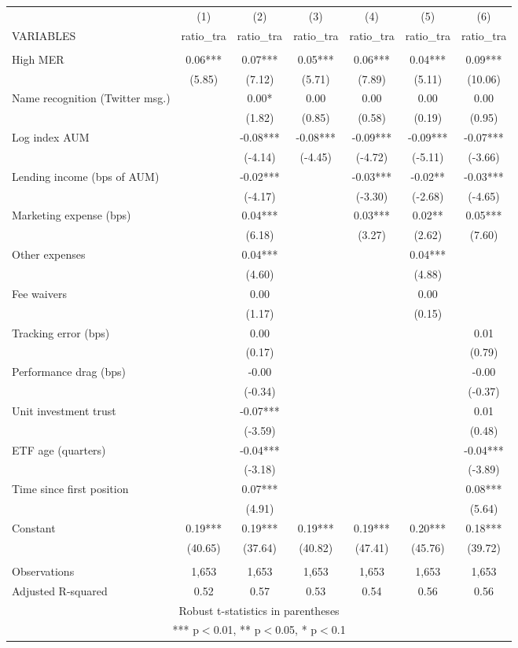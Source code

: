 \documentclass[]{article}
\begin{document}
\begin{tabular}{lcccccc} \hline
 & (1) & (2) & (3) & (4) & (5) & (6) \\
VARIABLES & ratio\_tra & ratio\_tra & ratio\_tra & ratio\_tra & ratio\_tra & ratio\_tra \\ \hline
 &  &  &  &  &  &  \\
High MER & 0.06*** & 0.07*** & 0.05*** & 0.06*** & 0.04*** & 0.09*** \\
 & (5.85) & (7.12) & (5.71) & (7.89) & (5.11) & (10.06) \\
Name recognition (Twitter msg.) &  & 0.00* & 0.00 & 0.00 & 0.00 & 0.00 \\
 &  & (1.82) & (0.85) & (0.58) & (0.19) & (0.95) \\
Log index AUM &  & -0.08*** & -0.08*** & -0.09*** & -0.09*** & -0.07*** \\
 &  & (-4.14) & (-4.45) & (-4.72) & (-5.11) & (-3.66) \\
Lending income (bps of AUM) &  & -0.02*** &  & -0.03*** & -0.02** & -0.03*** \\
 &  & (-4.17) &  & (-3.30) & (-2.68) & (-4.65) \\
Marketing expense (bps) &  & 0.04*** &  & 0.03*** & 0.02** & 0.05*** \\
 &  & (6.18) &  & (3.27) & (2.62) & (7.60) \\
Other expenses &  & 0.04*** &  &  & 0.04*** &  \\
 &  & (4.60) &  &  & (4.88) &  \\
Fee waivers &  & 0.00 &  &  & 0.00 &  \\
 &  & (1.17) &  &  & (0.15) &  \\
Tracking error (bps) &  & 0.00 &  &  &  & 0.01 \\
 &  & (0.17) &  &  &  & (0.79) \\
Performance drag (bps) &  & -0.00 &  &  &  & -0.00 \\
 &  & (-0.34) &  &  &  & (-0.37) \\
Unit investment trust &  & -0.07*** &  &  &  & 0.01 \\
 &  & (-3.59) &  &  &  & (0.48) \\
ETF age (quarters) &  & -0.04*** &  &  &  & -0.04*** \\
 &  & (-3.18) &  &  &  & (-3.89) \\
Time since first position &  & 0.07*** &  &  &  & 0.08*** \\
 &  & (4.91) &  &  &  & (5.64) \\
Constant & 0.19*** & 0.19*** & 0.19*** & 0.19*** & 0.20*** & 0.18*** \\
 & (40.65) & (37.64) & (40.82) & (47.41) & (45.76) & (39.72) \\
 &  &  &  &  &  &  \\
Observations & 1,653 & 1,653 & 1,653 & 1,653 & 1,653 & 1,653 \\
 Adjusted R-squared & 0.52 & 0.57 & 0.53 & 0.54 & 0.56 & 0.56 \\ \hline
\multicolumn{7}{c}{ Robust t-statistics in parentheses} \\
\multicolumn{7}{c}{ *** p$<$0.01, ** p$<$0.05, * p$<$0.1} \\
\end{tabular}
\end{document}
